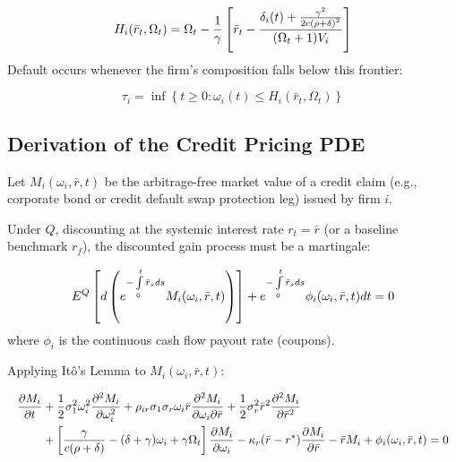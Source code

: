 \documentclass[11pt,letterpaper]{report}
\newcommand{\fitmath}[1]{\begingroup\setbox0=\hbox{$\displaystyle #1$}\ifdim\wd0>\linewidth\resizebox{\linewidth}{!}{$\displaystyle #1$}\else\displaystyle #1\fi\endgroup}
\begin{document}
\[\fitmath{{H}_{i}({\bar{r}}_{t},{\Omega }_{t})={\Omega }_{t}-\frac{1}{\gamma }\left[{{\bar{r}}_{t}-\frac{{\delta }_{i}(t)+\frac{{\gamma }^{2}}{2c(\rho +\delta {)}^{2}}}{({\Omega }_{t}+1){V}_{i}}}\right]}\]
Default occurs whenever the firm's composition falls below this frontier:

\[
{\tau }_{i}=\inf \left\{{t\geq 0:{\omega }_{i}(t)\leq {H}_{i}({\bar{r}}_{t},{\Omega }_{t})}\right\}
\]
\subsection{Derivation of the Credit Pricing PDE}
Let ${M}_{i}({\omega }_{i},\bar{r},t)$ be the arbitrage-free market value of a credit claim (e.g., corporate bond or credit default swap protection leg) issued by firm $i$.

Under $Q$, discounting at the systemic interest rate ${r}_{t}=\bar{r}$ (or a baseline benchmark ${r}_{f}$), the discounted gain process must be a martingale:

\[\fitmath{{E}^{Q}\left[{d\left({{e}^{-\int\limits_{0}^{t}{\bar{r}}_{s}ds}{M}_{i}({\omega }_{i},\bar{r},t)}\right)}\right]+{e}^{-\int\limits_{0}^{t}{\bar{r}}_{s}ds}{\phi }_{i}({\omega }_{i},\bar{r},t)dt=0}\]
where ${\phi }_{i}$ is the continuous cash flow payout rate (coupons).

Applying Itô's Lemma to ${M}_{i}({\omega }_{i},\bar{r},t)$:

\[\fitmath{\begin{aligned} \frac{\partial M_i}{\partial t} &+ \frac{1}{2} \sigma_1^2 \omega_i^2 \frac{\partial^2 M_i}{\partial \omega_i^2} + \rho_{ir} \sigma_1 \sigma_r \omega_i \bar{r} \frac{\partial^2 M_i}{\partial \omega_i \partial \bar{r}} + \frac{1}{2} \sigma_r^2 \bar{r}^2 \frac{\partial^2 M_i}{\partial \bar{r}^2} \\ &+ \left[ \frac{\gamma}{c(\rho + \delta)} - (\delta + \gamma)\omega_i + \gamma \Omega_t \right] \frac{\partial M_i}{\partial \omega_i} - \kappa_r (\bar{r} - r^*) \frac{\partial M_i}{\partial \bar{r}} - \bar{r} M_i + \phi_i(\omega_i, \bar{r}, t) = 0 \end{aligned}}\]
\end{document}
